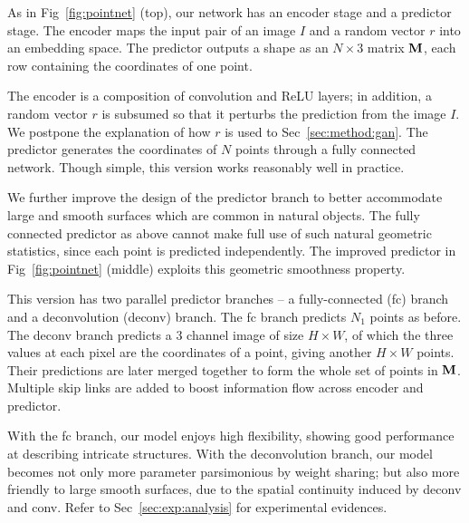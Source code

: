\documentclass[10pt,twocolumn,letterpaper]{article}
\newcommand{\image}{I}
\begin{document}

As in Fig~\ref{fig:pointnet} (top), our network has an encoder stage and a predictor stage. The encoder maps the input pair of an image $\image$ and a random vector $r$ into an embedding space. The predictor outputs a shape as an $N\times 3$ matrix ${\bf M}$, each row containing the coordinates of one point.

The encoder is a composition of convolution and ReLU layers; in addition, a random vector $r$ is subsumed so that it perturbs the prediction from the image $I$. We postpone the explanation of how $r$ is used to Sec~\ref{sec:method:gan}. %
The predictor generates the coordinates of $N$ points through a fully connected network. Though simple, this version works reasonably well in practice. 

We further improve the design of the predictor branch to better accommodate large and smooth surfaces which are common in natural objects. The fully connected predictor as above cannot make full use of such natural geometric statistics, since each point is predicted independently. The improved predictor in Fig~\ref{fig:pointnet} (middle) exploits this geometric smoothness property. 

This version has two parallel predictor branches -- a fully-connected (fc) branch and a deconvolution (deconv) branch. The fc branch predicts $N_1$ points as before. The deconv branch predicts a 3 channel image of size $H\times W$, of which the three values at each pixel are the coordinates of a point, giving another $H\times W$ points. Their predictions are later merged together to form the whole set of points in ${\bf M}$. Multiple skip links are added to boost information flow across encoder and predictor. 

With the fc branch, our model enjoys high flexibility, showing good performance at describing intricate structures. With the deconvolution branch, our model becomes not only more parameter parsimonious by weight sharing; but also more friendly to large smooth surfaces, due to the spatial continuity induced by deconv and conv. Refer to Sec~\ref{sec:exp:analysis} for experimental evidences. 
\end{document}
